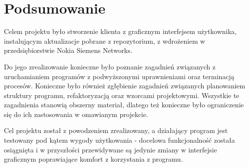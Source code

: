 \documentclass[polish,12pt,titlepage]{article}
\begin{document}
\newpage


\section*{Podsumowanie}

Celem projektu było stworzenie klienta z graficznym interfejsem użytkownika,
instalującym aktualizacje pobrane z repozytorium, z wdrożeniem w 
przedsiębiorstwie Nokia Siemens Networks.

Do jego zrealizowanie konieczne było poznanie zagadnień związanych z
uruchamianiem programów z podwyższonymi uprawnieniami oraz terminacją
procesów. Konieczne było również zgłębienie zagadnień związanych planowaniem
struktury programu, refaktoryzacją oraz wzorcami projektowymi. Wszystkie te
zagadnienia stanowią obszerny materiał, dlatego też konieczne było
ograniczenie się do ich zastosowania w omawianym projekcie.

Cel projektu został z powodzeniem zrealizowany, a działający program jest
testowany pod kątem wygody użytkowania - docelowa funkcjonalność została
osiągnięta i w przyszłości przewidywane są jedynie zmiany w interfejsie
graficznym poprawiające komfort z korzystania z programu.

\newpage





\end{document}
